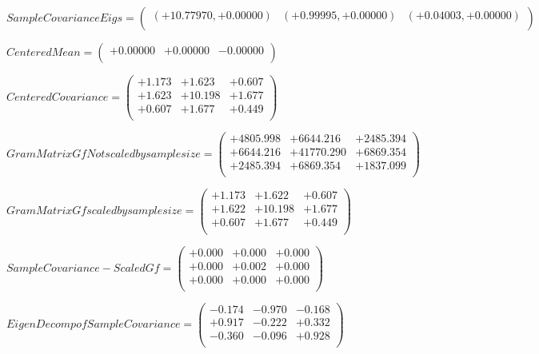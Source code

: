 \documentclass[9pt]{article}
\theoremstyle{plain}
\theoremstyle{definition}
\theoremstyle{remark}
\numberwithin{equation}{section}
\begin{document}
$Sample Covariance Eigs = \left(
\begin{array}{
ccc}
(+10.77970,+0.00000) & (+0.99995,+0.00000) & (+0.04003,+0.00000) \\
\end{array}
\right)$ \newline 

$Centered Mean = \left(
\begin{array}{
ccc}
+0.00000 & +0.00000 & -0.00000 \\
\end{array}
\right)$ \newline 

$Centered Covariance = \left(
\begin{array}{
ccc}
+1.173 & +1.623 & +0.607 \\
+1.623 & +10.198 & +1.677 \\
+0.607 & +1.677 & +0.449 \\
\end{array}
\right)$ \newline 

$Gram Matrix Gf Not scaled by sample size = \left(
\begin{array}{
ccc}
+4805.998 & +6644.216 & +2485.394 \\
+6644.216 & +41770.290 & +6869.354 \\
+2485.394 & +6869.354 & +1837.099 \\
\end{array}
\right)$ \newline 

$Gram Matrix Gf  scaled by sample size = \left(
\begin{array}{
ccc}
+1.173 & +1.622 & +0.607 \\
+1.622 & +10.198 & +1.677 \\
+0.607 & +1.677 & +0.449 \\
\end{array}
\right)$ \newline 

$SampleCovariance - Scaled Gf = \left(
\begin{array}{
ccc}
+0.000 & +0.000 & +0.000 \\
+0.000 & +0.002 & +0.000 \\
+0.000 & +0.000 & +0.000 \\
\end{array}
\right)$ \newline 

$EigenDecomp of SampleCovariance = \left(
\begin{array}{
ccc}
-0.174 & -0.970 & -0.168 \\
+0.917 & -0.222 & +0.332 \\
-0.360 & -0.096 & +0.928 \\
\end{array}
\right)$ \newline 
\end{document}
